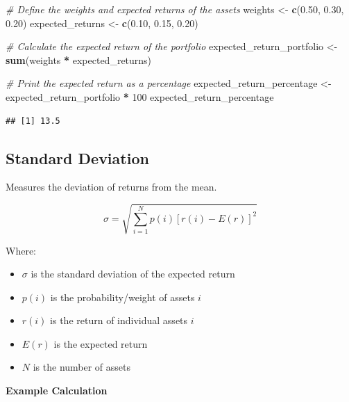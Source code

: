 \documentclass[
]{book}
\newenvironment{Shaded}{\begin{snugshade}}{\end{snugshade}}
\newcommand{\CommentTok}[1]{\textcolor[rgb]{0.56,0.35,0.01}{\textit{#1}}}
\newcommand{\DecValTok}[1]{\textcolor[rgb]{0.00,0.00,0.81}{#1}}
\newcommand{\FloatTok}[1]{\textcolor[rgb]{0.00,0.00,0.81}{#1}}
\newcommand{\FunctionTok}[1]{\textcolor[rgb]{0.13,0.29,0.53}{\textbf{#1}}}
\newcommand{\NormalTok}[1]{#1}
\newcommand{\OtherTok}[1]{\textcolor[rgb]{0.56,0.35,0.01}{#1}}
\newcommand{\SpecialCharTok}[1]{\textcolor[rgb]{0.81,0.36,0.00}{\textbf{#1}}}
\providecommand{\tightlist}{%
  \setlength{\itemsep}{0pt}\setlength{\parskip}{0pt}}
\begin{document}
\begin{Shaded}
\begin{Highlighting}[]
\CommentTok{\# Define the weights and expected returns of the assets}
\NormalTok{weights          }\OtherTok{\textless{}{-}} \FunctionTok{c}\NormalTok{(}\FloatTok{0.50}\NormalTok{, }\FloatTok{0.30}\NormalTok{, }\FloatTok{0.20}\NormalTok{)}
\NormalTok{expected\_returns }\OtherTok{\textless{}{-}} \FunctionTok{c}\NormalTok{(}\FloatTok{0.10}\NormalTok{, }\FloatTok{0.15}\NormalTok{, }\FloatTok{0.20}\NormalTok{)}

\CommentTok{\# Calculate the expected return of the portfolio}
\NormalTok{expected\_return\_portfolio }\OtherTok{\textless{}{-}} \FunctionTok{sum}\NormalTok{(weights }\SpecialCharTok{*}\NormalTok{ expected\_returns)}

\CommentTok{\# Print the expected return as a percentage}
\NormalTok{expected\_return\_percentage }\OtherTok{\textless{}{-}}\NormalTok{ expected\_return\_portfolio }\SpecialCharTok{*} \DecValTok{100}
\NormalTok{expected\_return\_percentage}
\end{Highlighting}
\end{Shaded}

\begin{verbatim}
## [1] 13.5
\end{verbatim}

\hypertarget{standard-deviation}{%
\subsection{Standard Deviation}\label{standard-deviation}}

Measures the deviation of returns from the mean.

\[
\sigma = \sqrt{\sum_{i=1}^{N} p(i) [r(i) - E(r)]^2}
\]

Where:

\begin{itemize}
\tightlist
\item
  \(\sigma\) is the standard deviation of the expected return
\item
  \(p(i)\) is the probability/weight of assets \(i\)
\item
  \(r(i)\) is the return of individual assets \(i\)
\item
  \(E(r)\) is the expected return
\item
  \(N\) is the number of assets
\end{itemize}

\textbf{Example Calculation}
\end{document}
